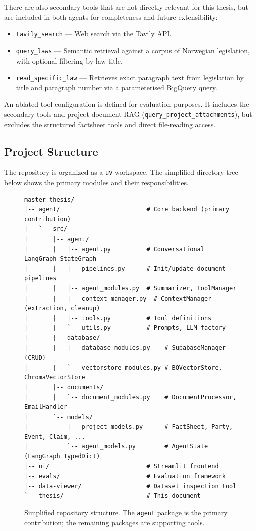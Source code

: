 There are also secondary tools that are not directly relevant for this thesis, but are included in both agents for completeness and future extensibility:
\begin{itemize}
    \item \texttt{tavily\_search} — Web search via the Tavily API.
    \item \texttt{query\_laws} — Semantic retrieval against a corpus of Norwegian legislation, with optional filtering by law title.
    \item \texttt{read\_specific\_law} — Retrieves exact paragraph text from legislation by title and paragraph number via a parameterised BigQuery query.
\end{itemize}

An ablated tool configuration is defined for evaluation purposes. It includes the secondary tools and project document RAG (\texttt{query\_project\_attachments}), but excludes the structured factsheet tools and direct file-reading access.

\subsection{Project Structure}

The repository is organized as a \texttt{uv} workspace. The simplified directory tree below shows the primary modules and their responsibilities.

\begin{figure}[H]
\centering
\begin{BVerbatim}
master-thesis/
|-- agent/                        # Core backend (primary contribution)
|   `-- src/
|       |-- agent/
|       |   |-- agent.py          # Conversational LangGraph StateGraph
|       |   |-- pipelines.py      # Init/update document pipelines
|       |   |-- agent_modules.py  # Summarizer, ToolManager
|       |   |-- context_manager.py  # ContextManager (extraction, cleanup)
|       |   |-- tools.py          # Tool definitions
|       |   `-- utils.py          # Prompts, LLM factory
|       |-- database/
|       |   |-- database_modules.py    # SupabaseManager (CRUD)
|       |   `-- vectorstore_modules.py # BQVectorStore, ChromaVectorStore
|       |-- documents/
|       |   `-- document_modules.py    # DocumentProcessor, EmailHandler
|       `-- models/
|           |-- project_models.py      # FactSheet, Party, Event, Claim, ...
|           `-- agent_models.py        # AgentState (LangGraph TypedDict)
|-- ui/                           # Streamlit frontend
|-- evals/                        # Evaluation framework
|-- data-viewer/                  # Dataset inspection tool
`-- thesis/                       # This document
\end{BVerbatim}
\caption{Simplified repository structure. The \texttt{agent} package is the primary contribution; the remaining packages are supporting tools.}
\label{fig:project-tree}
\end{figure}

